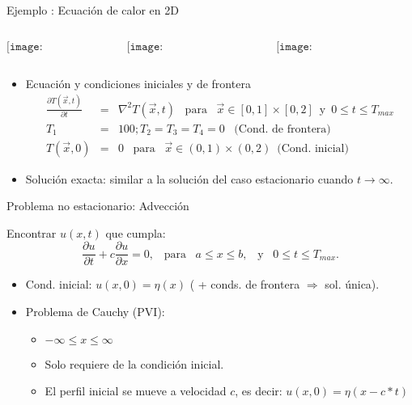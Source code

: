 \documentclass[handout]{beamer}
\newcommand{\Vector}[1]{\vec{#1}}
\begin{document}
\begin{frame}{Ejemplo : Ecuaci\'on de calor en 2D}

\begin{columns}
	\begin{column}{0.3\textwidth}
		$$\texttt{[image: Hoffman.png]}$$
	\end{column}
	\begin{column}{0.3\textwidth}
		$$\texttt{[image: HoffmanExact.png]}$$
	\end{column}
	\begin{column}{0.3\textwidth}
		$$\texttt{[image: HoffmanExactS.png]}$$
	\end{column}
\end{columns}

{\footnotesize{
\begin{itemize}
\item Ecuaci\'on y condiciones iniciales y de frontera
\begin{eqnarray*}
\frac{\partial T(\Vector{x},t)}{\partial t} & = & \nabla^2 T(\Vector{x}, t) \,\,\,\,\, \text{para} \,\,\,\,\, \Vector{x} \in [0,1] \times [0,2]  \,\,\, \text{y} \,\,\, 0 \leq t \leq T_{max} \\
T_1 & = & 100; T_2 = T_3 = T_4 = 0 \,\,\,\,\, \text{(Cond. de frontera)} \\
T(\Vector{x}, 0) & = & 0 \,\,\,\,\, \text{para} \,\,\,\,\, \Vector{x} \in (0,1) \times (0,2) \,\,\, \text{(Cond. inicial)} 
\end{eqnarray*}
\item Soluci\'on exacta: similar a la soluci\'on del caso estacionario cuando $t \rightarrow \infty$.

\end{itemize}
}}

\end{frame}


\begin{frame}{Problema no estacionario: Advecci\'on}

Encontrar $u(x,t)$ que cumpla:
\[
\frac{\partial u}{\partial t} +  c \frac{\partial u}{\partial x}  = 0,
\,\,\, \text{ para } \,\,\, a \leq x \leq b, \,\,\, \text{ y } \,\,\, 0 \leq t \leq T_{max}.
\]

\begin{itemize}[<+->]
	\item Cond. inicial: $u(x,0) = \eta(x)$ ( + conds. de frontera $\Longrightarrow$ sol. \'unica).
	\item Problema de Cauchy (PVI): 
	\begin{itemize}
		\item $-\infty \leq x \leq \infty$ 
		\item Solo requiere de la condici\'on inicial.
		\item El perfil inicial se mueve a velocidad $c$, es decir: $u(x,0) = \eta(x - c * t)$
	\end{itemize}

\end{itemize}

\end{frame}
\end{document}
